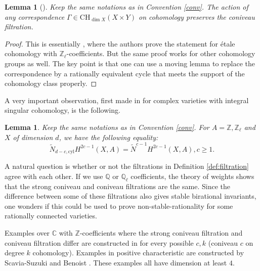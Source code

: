\documentclass{amsart}
\newtheorem{lem}[theorem]{Lemma}
\theoremstyle{definition}
\theoremstyle{remark}
\newcommand{\mbb}{\mathbb}
\newcommand{\QQ}{\mbb{Q}}
\newcommand{\ZZ}{\mbb{Z}}
\newcommand{\CC}{\mbb{C}}
\newcommand{\cyl}{\text{cyl}}
\begin{document}
\begin{lem}[{\cite[Lemma 2.3]{ScaviaSuzuki2023coniveau}}]\label{lem:fil_corr}
    Keep the same notations as in Convention \ref{conv}. The action of any correspondence $\Gamma \in \text{CH}_{\dim X}(X \times Y)$ on cohomology preserves the coniveau filtration.
\end{lem}
\begin{proof}
    This is essentially {\cite[Lemma 2.3]{ScaviaSuzuki2023coniveau}}, where the authors prove the statement for \'etale cohomology with $\ZZ_\ell$-coefficients. But the same proof works for other cohomology groups as well. The key point is that one can use a moving lemma to replace the correspondence by a rationally equivalent cycle that meets the support of the cohomology class properly.
\end{proof}

A very important observation, first made in \cite{VoisinConiveau} for complex varieties with integral singular cohomology, is the following.
\begin{lem}\cite[Proposition 1.3]{VoisinConiveau} \cite[Lemma 2.4]{ScaviaSuzuki2023coniveau}\label{lem:inclusion}
Keep the same notations as in Convention \ref{conv}.
For $A=\ZZ, \ZZ_\ell$ and $X$ of dimension $d$, we have the following equality:
\[
 \tilde{N}_{d-c, \cyl}H^{2c-1}(X, A) = \tilde{N}^{c-1}H^{2c-1}(X, A), c\geq 1.
\]
\end{lem}

A natural question is whether or not the filtrations in Definition \ref{def:filtration} agree with each other. 
If we use $\QQ$ or $\QQ_\ell$ coefficients, the theory of weights shows that the strong coniveau and coniveau filtrations are the same.
Since the difference between some of these filtrations also gives stable birational invariants, one wonders if this could be used to prove non-stable-rationality for some rationally connected varieties.

Examples over $\CC$ with $\ZZ$-coefficients where the strong coniveau filtration and coniveau filtration differ are constructed in \cite{BO_Coniveau} for every possible $c, k$ (coniveau $c$ on degree $k$ cohomology). Examples in positive characteristic are constructed by Scavia-Suzuki \cite{ScaviaSuzuki_examples} and Benoist \cite{Benoist2022Steenrod}.
These examples all have dimension at least $4$.
\end{document}
